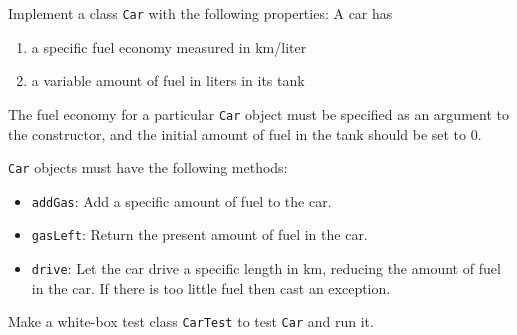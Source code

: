 \label{ex:car}
Implement a class \lstinline{Car} with the following properties: A car has 
\begin{enumerate}
\item a specific fuel economy measured in km/liter
\item a variable amount of fuel in liters in its tank
\end{enumerate}
The fuel economy for a particular \lstinline{Car} object must be specified as an argument to the constructor, and the initial amount of fuel in the tank should be set to 0.

\lstinline{Car} objects must have the following methods:
\begin{itemize}
\item \lstinline{addGas}: Add a specific amount of fuel to the car.
\item \lstinline{gasLeft}: Return the present amount of fuel in the car.
\item \lstinline{drive}: Let the car drive a specific length in km, reducing the amount of fuel in the car. If there is too little fuel then cast an exception.
\end{itemize}
Make a white-box test class \lstinline{CarTest} to test \lstinline{Car} and run it.
